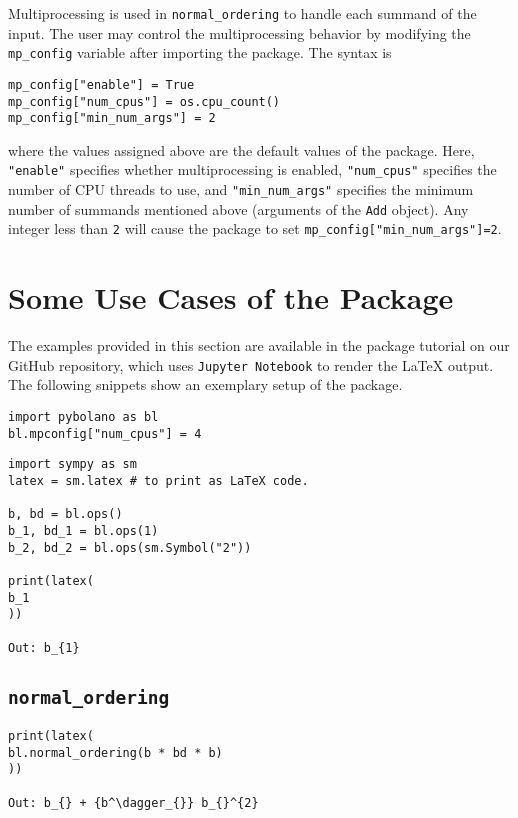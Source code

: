 \documentclass[5p, twocolumn, 10pt, sort&compress]{elsarticle}
\newcommand{\inlinecode}[1]{\texttt{#1}}
\begin{document}
Multiprocessing is used in \inlinecode{normal_ordering} to handle each summand of the input. The user may control the multiprocessing behavior by modifying the \inlinecode{mp_config} variable after importing the package. The syntax is
\begin{verbatim}
mp_config["enable"] = True
mp_config["num_cpus"] = os.cpu_count()
mp_config["min_num_args"] = 2
\end{verbatim}
where the values assigned above are the default values of the package. Here, \inlinecode{"enable"} specifies whether multiprocessing is enabled, \inlinecode{"num_cpus"} specifies the number of CPU threads to use, and \inlinecode{"min_num_args"} specifies the minimum number of summands mentioned above (arguments of the \inlinecode{Add} object). Any integer less than \inlinecode{2} will cause the package to set \inlinecode{mp_config["min_num_args"]=2}. 


\section{Some Use Cases of the Package}\label{section:examples}

The examples provided in this section are available in the package tutorial on our GitHub repository, which uses \texttt{Jupyter Notebook} to render the \LaTeX{} output. The following snippets show an exemplary setup of the package.
\begin{verbatim}
import pybolano as bl
bl.mpconfig["num_cpus"] = 4
\end{verbatim}

\begin{verbatim}
import sympy as sm
latex = sm.latex # to print as LaTeX code.

b, bd = bl.ops()
b_1, bd_1 = bl.ops(1)
b_2, bd_2 = bl.ops(sm.Symbol("2"))

print(latex(
b_1
))

Out: b_{1}
\end{verbatim}

\subsection{\inlinecode{normal_ordering}}

\begin{verbatim}
print(latex(
bl.normal_ordering(b * bd * b)
))

Out: b_{} + {b^\dagger_{}} b_{}^{2}
\end{verbatim}
\end{document}
